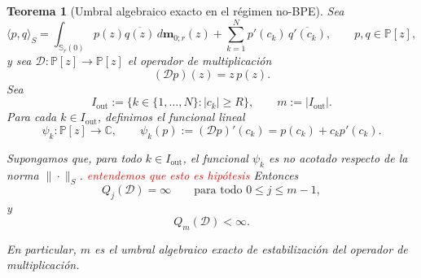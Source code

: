 \documentclass[12pt,a4paper]{article}
\newtheorem{theorem}{Teorema}
\theoremstyle{definition}
\theoremstyle{remark}
\begin{document}
\begin{theorem}[Umbral algebraico exacto en el régimen no-BPE]
	\label{thm:umbral_exacto_Qm_nobpe}
	Sea
	\[
		\langle p,q\rangle_S
		=
		\int_{\mathbb{S}_r(0)} p(z)\overline{q(z)} \, d\mathbf{m}_{0;r}(z)
		+
		\sum_{k=1}^N p'(c_k)\,\overline{q'(c_k)},
		\qquad p,q\in\mathbb P[z],
	\]
	y sea $\mathcal D:\mathbb P[z]\to\mathbb P[z]$ el operador de multiplicación
	\[
		(\mathcal D p)(z)=z\,p(z).
	\]
	Sea
	\[
		I_{\mathrm{out}}:=\{k\in\{1,\dots,N\}: |c_k|\ge R\},
		\qquad
		m:=|I_{\mathrm{out}}|.
	\]
	Para cada $k\in I_{\mathrm{out}}$, definimos el funcional lineal
	\[
		\psi_k:\mathbb P[z]\to\mathbb C,
		\qquad
		\psi_k(p):=(\mathcal D p)'(c_k)=p(c_k)+c_kp'(c_k).
	\]

	Supongamos que, para todo $k\in I_{\mathrm{out}}$, el funcional $\psi_k$ es no acotado
	respecto de la norma $\|\cdot\|_S$.
\textcolor{red}{entendemos que esto es hipótesis }
	Entonces
	\[
		Q_j(\mathcal D)=\infty
		\qquad \text{para todo } 0\le j\le m-1,
	\]
	y
	\[
		Q_m(\mathcal D)<\infty.
	\]

	En particular, $m$ es el umbral algebraico exacto de estabilización del operador
	de multiplicación.
\end{theorem}
\end{document}
